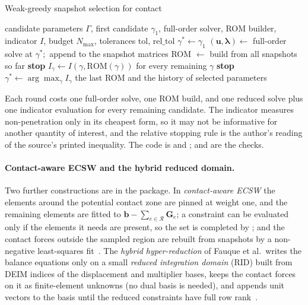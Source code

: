 \begin{algbox}{Weak-greedy snapshot selection for contact}
\begin{pseudo}
\Require candidate parameters $\Gamma$, first candidate $\gamma_1$, full-order solver, ROM builder, indicator $I$, budget $N_{\max}$, tolerances $\mathrm{tol}$, $\mathrm{rel\_tol}$
\State $\gamma^\ast\gets\gamma_1$
  \State $(\bm u,\bm\lambda)\gets$ full-order solve at $\gamma^\ast$;\ append to the snapshot matrices
  \State ROM $\gets$ build from all snapshots so far
   \textbf{stop} \EndIf
  \State $I_\gamma\gets I(\gamma,\mathrm{ROM}(\gamma))$ for every remaining $\gamma$ 
   \textbf{stop} \EndIf
  \State $\gamma^\ast\gets\arg\max_\gamma I_\gamma$
\EndFor
\Ensure the last ROM and the history of selected parameters
\end{pseudo}
\end{algbox}

Each round costs one full-order solve, one ROM build, and one reduced solve plus one indicator evaluation for every remaining candidate. The indicator measures non-penetration only in its cheapest form, so it may not be informative for another quantity of interest, and the relative stopping rule is the author's reading of the source's printed inequality. The code is  and ;  and  are the checks.


\paragraph{Contact-aware ECSW and the hybrid reduced domain.}
Two further constructions are in the package. In \emph{contact-aware ECSW} the elements around the potential contact zone are pinned at weight one, and the remaining elements are fitted to $\bm b-\sum_{e\in\mathcal R}\bm G_e$; a constraint can be evaluated only if the elements it needs are present, so the set is completed by ; and the contact forces outside the sampled region are rebuilt from snapshots by a non-negative least-squares fit~\cite{fauque2018hybrid,nikiema2026assembly}. The \emph{hybrid hyper-reduction} of Fauque et al.\ writes the balance equations only on a small \emph{reduced integration domain} (RID) built from DEIM indices of the displacement and multiplier bases, keeps the contact forces on it as finite-element unknowns (no dual basis is needed), and appends unit vectors to the basis until the reduced constraints have full row rank~\cite{fauque2018hybrid}.

